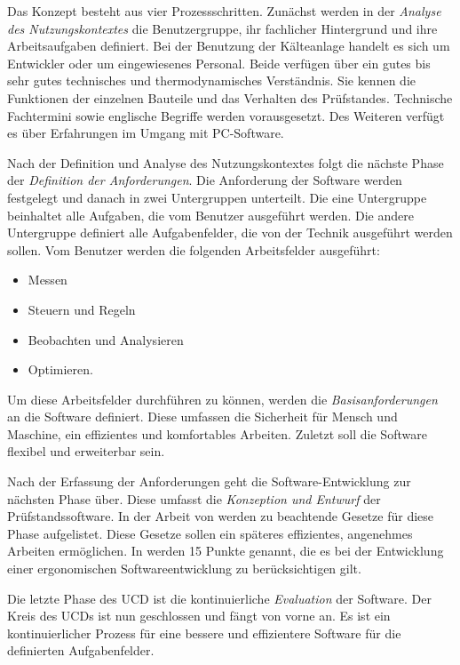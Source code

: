 Das Konzept besteht aus vier Prozessschritten. Zunächst werden in der \textit{Analyse des Nutzungskontextes} die Benutzergruppe, ihr fachlicher Hintergrund und ihre Arbeitsaufgaben definiert. Bei der Benutzung der Kälteanlage handelt es sich um Entwickler oder um eingewiesenes Personal. Beide verfügen über ein gutes bis sehr gutes technisches und thermodynamisches Verständnis. Sie kennen die Funktionen der einzelnen Bauteile und das Verhalten des Prüfstandes. Technische Fachtermini sowie englische Begriffe werden vorausgesetzt.  Des Weiteren verfügt es über Erfahrungen im Umgang mit PC-Software.

Nach der Definition und Analyse des Nutzungskontextes folgt die nächste Phase der \textit{Definition der Anforderungen}. Die Anforderung der Software werden festgelegt und danach in zwei Untergruppen unterteilt. Die eine Untergruppe beinhaltet alle Aufgaben, die vom Benutzer ausgeführt werden. Die andere Untergruppe definiert alle Aufgabenfelder, die von der Technik ausgeführt werden sollen. 
Vom Benutzer werden die folgenden Arbeitsfelder ausgeführt:

\begin{itemize}
\item	Messen
\item	Steuern und Regeln
\item	Beobachten und Analysieren
\item	Optimieren.
\end{itemize}

Um diese Arbeitsfelder durchführen zu können, werden die \textit{Basisanforderungen} an die Software definiert. Diese umfassen die Sicherheit für Mensch und Maschine, ein effizientes und komfortables Arbeiten. Zuletzt soll die Software flexibel und erweiterbar sein. 

Nach der Erfassung der Anforderungen geht die Software-Entwicklung zur nächsten Phase über. Diese umfasst die \textit{Konzeption und Entwurf} der Prüfstandssoftware. In der Arbeit von \textsc{\citeauthor{Neumann2007}} \citep{Neumann2007} werden zu beachtende Gesetze für diese Phase aufgelistet. Diese Gesetze sollen ein späteres effizientes, angenehmes Arbeiten ermöglichen. In \citep{Preim2013} werden 15 Punkte genannt, die es bei der Entwicklung einer ergonomischen Softwareentwicklung zu berücksichtigen gilt.

Die letzte Phase des UCD ist die kontinuierliche \textit{Evaluation} der Software. Der Kreis des UCDs ist nun geschlossen und fängt von vorne an. Es ist ein kontinuierlicher Prozess für eine bessere und effizientere Software für die definierten Aufgabenfelder. 

